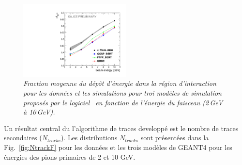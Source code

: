 \begin{figure}
	\centering
	\includegraphics[width=0.5\textwidth]{ECAL/plots/e-ir-graph.pdf}
	\caption{\label{fig:irgraphF} \sl  Fraction moyenne du dépôt d'énergie dans la région d'interaction pour les données et les simulations  pour troi modèles de simulation proposés par le logiciel \geant\ en fonction de l'énergie du faisceau (2\,GeV à 10\,GeV).}
\end{figure}



Un résultat central du l'algorithme de traces developp\'e est le nombre de traces secondaires ($N_ {tracks}$). %
Les distributions $N_ {tracks}$ sont présentées dans la Fig.~\ref{fig:NtrackF} pour  les données et les trois modèles de GEANT4 pour les énergies des pions primaires de 2 et 10 GeV. 

